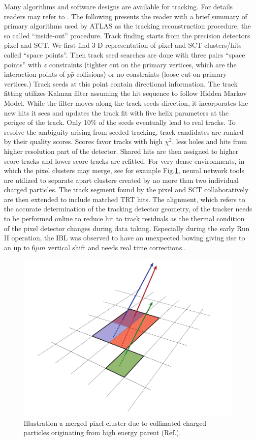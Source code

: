 \label{sec:reco-tracking}
Many algorithms and software designs are available for tracking. For details readers may refer to \cite{Cornelissen:1020106}. The following presents the reader with a brief summary of primary algorithms used by ATLAS as the tracking reconstruction procedure, the so called ``inside-out'' procedure. Track finding starts from the precision detectors pixel and SCT. We first find 3-D representation of pixel and SCT clusters/hits called ``space points''. Then track seed searches are done with three pairs ``space points'' with $z$ constraints (tighter cut on the primary vertices, which are the interaction points of $p\bar p$ collisions) or no constraints (loose cut on primary vertices.) Track seeds at this point contain directional information. The track fitting utilizes Kalman filter assuming the hit sequence to follow Hidden Markov Model. While the filter moves along the track seeds direction, it incorporates the new hits it sees and updates the track fit with five helix parameters at the perigee of the track. Only 10\% of the seeds eventually lead to real tracks. To resolve the ambiguity arising from seeded tracking, track candidates are ranked by their quality scores. Scores favor tracks with high $\chi^2$, less holes and hits from higher resolution part of the detector. Shared hits are then assigned to higher score tracks and lower score tracks are refitted. For very dense environments, in which the pixel clusters may merge, see for example Fig.\ref{fig:reco-trackingcluster}, neural network tools are utilized to separate apart clusters created by no more than two individual charged particles\cite{PERF-2012-05,Aaboud:2017all}. The track segment found by the pixel and SCT collaboratively are then extended to include matched TRT hits. The alignment, which refers to the accurate determination of the tracking detector geometry, of the tracker needs to be performed online to reduce hit to track residuals as the thermal condition of the pixel detector changes during data taking. Especially during the early Run II operation, the IBL was observed to have an unexpected bowing giving rise to an up to 6$\mu m$ vertical shift and needs real time corrections.\cite{tracking-align}.

\begin{figure}[htpb!]
\begin{center}
  \includegraphics[width=0.55\linewidth]{figures/Reco/TrackingClusterB}
  \caption{ Illustration a merged pixel cluster due to collimated charged particles originating from high energy parent (Ref.\cite{Aaboud:2017all}). }
\label{fig:reco-trackingcluster}
\end{center}
\end{figure}


